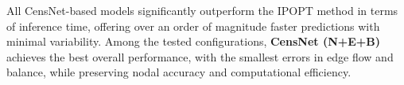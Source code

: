 All CensNet-based models significantly outperform the IPOPT method in terms of inference time, offering over an order of magnitude faster predictions with minimal variability. Among the tested configurations, \textbf{CensNet (N+E+B)} achieves the best overall performance, with the smallest errors in edge flow and balance, while preserving nodal accuracy and computational efficiency.

%  
%
%
